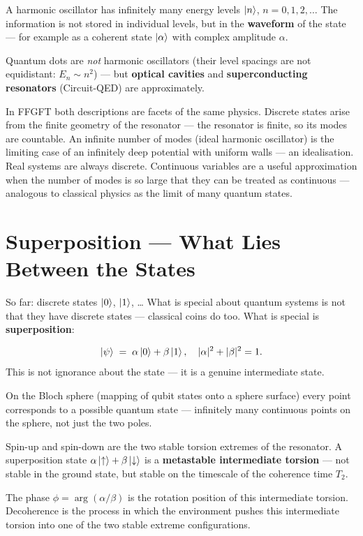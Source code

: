 A harmonic oscillator has infinitely many
energy levels $\left|n\right\rangle$, $n = 0, 1, 2, \ldots$
The information is not stored in individual levels,
but in the \textbf{waveform}
of the state --- for example as a coherent state
$\left|\alpha\right\rangle$ with complex amplitude $\alpha$.

Quantum dots are \emph{not} harmonic oscillators
(their level spacings are not equidistant: $E_n \sim n^2$) ---
but \textbf{optical cavities} and
\textbf{superconducting resonators} (Circuit-QED) are approximately.

\begin{keypoint}
In FFGFT both descriptions are facets of the same
physics. Discrete states arise from the
finite geometry of the resonator --- the resonator
is finite, so its modes are countable.
An infinite number of modes (ideal harmonic oscillator)
is the limiting case of an infinitely deep potential
with uniform walls --- an idealisation.
Real systems are always discrete.
Continuous variables are a useful approximation
when the number of modes is so large that they can be
treated as continuous ---
analogous to classical physics as the limit of many quantum states.
\end{keypoint}

\section{Superposition --- What Lies Between the States}
\label{sec:superposition}

So far: discrete states $\left|0\right\rangle$, $\left|1\right\rangle$, \ldots
What is special about quantum systems is not that they
have discrete states --- classical coins do too.
What is special is \textbf{superposition}:

\begin{equation}
  \left|\psi\right\rangle \;=\; \alpha\left|0\right\rangle + \beta\left|1\right\rangle,
  \quad |\alpha|^2 + |\beta|^2 = 1.
\end{equation}
This is not ignorance about the state ---
it is a genuine intermediate state.

On the Bloch sphere (mapping of qubit states
onto a sphere surface) every point corresponds
to a possible quantum state ---
infinitely many continuous points on the sphere,
not just the two poles.

\begin{foundation}
Spin-up and spin-down are the two stable
torsion extremes of the resonator.
A superposition state $\alpha\left|\uparrow\right\rangle+\beta\left|\downarrow\right\rangle$
is a \textbf{metastable intermediate torsion} ---
not stable in the ground state, but stable on
the timescale of the coherence time $T_2$.

The phase $\phi = \arg(\alpha/\beta)$ is the
rotation position of this intermediate torsion.
Decoherence is the process in which the environment
pushes this intermediate torsion into one of the two
stable extreme configurations.
\end{foundation}

